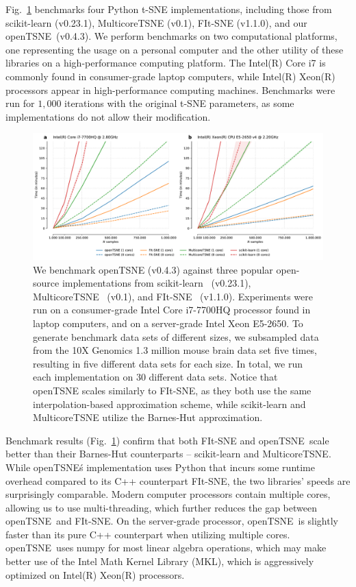 \documentclass[twocolumn]{bmcart}
\newcommand{\opentsne}{\textsf{openTSNE}}
\begin{document}
Fig.~\ref{fig:benchmarks} benchmarks four Python t-SNE implementations, including those from \textsf{scikit-learn} (v0.23.1), \textsf{MulticoreTSNE} (v0.1), \textsf{FIt-SNE} (v1.1.0), and our \opentsne\ (v0.4.3). We perform benchmarks on two computational platforms, one representing the usage on a personal computer and the other utility of these libraries on a high-performance computing platform. The Intel(R) Core i7 is commonly found in consumer-grade laptop computers, while Intel(R) Xeon(R) processors appear in high-performance computing machines. Benchmarks were run for $1,000$ iterations with the original t-SNE parameters, as some implementations do not allow their modification. 

\begin{figure}[htbp]
  \includegraphics[width=\textwidth]{benchmarks}
  \caption{\label{fig:benchmarks}
We benchmark openTSNE (v0.4.3) against three popular open-source implementations from scikit-learn~\cite{pedregosa2011scikit} (v0.23.1), MulticoreTSNE~\cite{Ulyanov2016} (v0.1), and FIt-SNE~\cite{linderman2019fast} (v1.1.0). Experiments were run on a consumer-grade Intel Core i7-7700HQ processor found in laptop computers, and on a server-grade Intel Xeon E5-2650. To generate benchmark data sets of different sizes, we subsampled data from the 10X Genomics 1.3 million mouse brain data set five times, resulting in five different data sets for each size. In total, we run each implementation on 30 different data sets. Notice that openTSNE scales similarly to FIt-SNE, as they both use the same interpolation-based approximation scheme, while scikit-learn and MulticoreTSNE utilize the Barnes-Hut approximation.
}
\end{figure}

Benchmark results (Fig.~\ref{fig:benchmarks}) confirm that both \textsf{FIt-SNE} and \opentsne\ scale better than their Barnes-Hut counterparts -- \textsf{scikit-learn} and \textsf{MulticoreTSNE}. While \opentsne\'s implementation uses Python that incurs some runtime overhead compared to its C++ counterpart \textsf{FIt-SNE}, the two libraries' speeds are surprisingly comparable. Modern computer processors contain multiple cores, allowing us to use multi-threading, which further reduces the gap between \opentsne\ and \textsf{FIt-SNE}. On the server-grade processor, \opentsne\ is slightly faster than its pure C++ counterpart when utilizing multiple cores. \opentsne\ uses \textsf{numpy} for most linear algebra operations, which may make better use of the Intel Math Kernel Library (MKL), which is aggressively optimized on Intel(R) Xeon(R) processors.  
\end{document}
